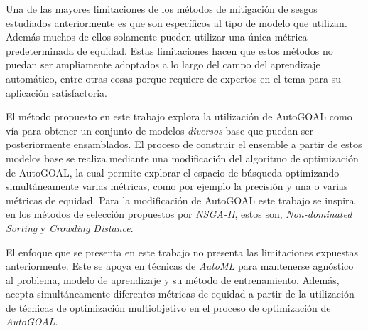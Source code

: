 Una de las mayores limitaciones de los métodos de mitigación de sesgos estudiados anteriormente es que son específicos al tipo de modelo que utilizan.
Además muchos de ellos solamente pueden utilizar una única métrica predeterminada de equidad.
Estas limitaciones hacen que estos métodos no puedan ser ampliamente adoptados a lo largo del campo del aprendizaje automático, entre otras cosas porque requiere de expertos en el tema para su aplicación satisfactoria.

El método propuesto en este trabajo explora la utilización de AutoGOAL como vía para obtener un conjunto de modelos \emph{diversos} base que puedan ser posteriormente ensamblados.
El proceso de construir el ensemble a partir de estos modelos base se realiza mediante una modificación del algoritmo de optimización de AutoGOAL, la cual permite explorar el espacio de búsqueda optimizando simultáneamente varias métricas, como por ejemplo la precisión y una o varias métricas de equidad.
Para la modificación de AutoGOAL este trabajo se inspira en los métodos de selección propuestos por \emph{NSGA-II}, estos son, \emph{Non-dominated Sorting} y \emph{Crowding Distance}.

El enfoque que se presenta en este trabajo no presenta las limitaciones expuestas anteriormente.
Este se apoya en técnicas de \emph{AutoML} para mantenerse agnóstico al problema, modelo de aprendizaje y su método de entrenamiento.
Además, acepta simultáneamente diferentes métricas de equidad a partir de la utilización de técnicas de optimización multiobjetivo en el proceso de optimización de \emph{AutoGOAL}.
